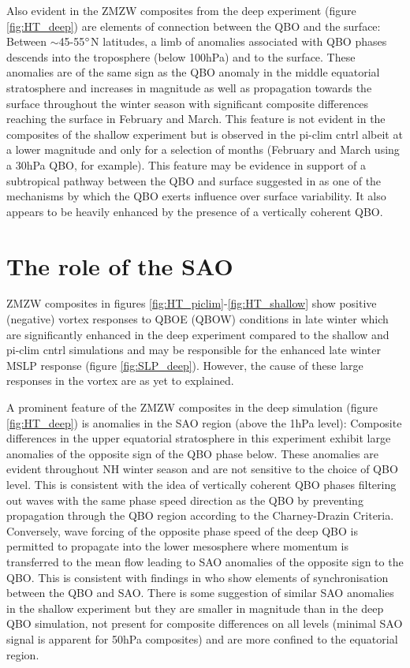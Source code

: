 Also evident in the ZMZW composites from the deep experiment (figure \ref{fig:HT_deep}) are elements of connection between the QBO and the surface: Between $\sim$45-55$\degree$N latitudes, a limb of anomalies associated with QBO phases descends into the troposphere (below 100hPa) and to the surface. These anomalies are of the same sign as the QBO anomaly in the middle equatorial stratosphere and increases in magnitude as well as propagation towards the surface throughout the winter season with significant composite differences reaching the surface in February and March. This feature is not evident in the composites of the shallow experiment but is observed in the pi-clim cntrl albeit at a lower magnitude and only for a selection of months (February and March using a 30hPa QBO, for example). This feature may be evidence in support of a subtropical pathway between the QBO and surface suggested in \cite{graySurface2018b} as one of the mechanisms by which the QBO exerts influence over surface variability. It also appears to be heavily enhanced by the presence of a vertically coherent QBO.

\section{The role of the SAO}
\label{sec:role_SAO}

ZMZW composites in figures \ref{fig:HT_piclim}-\ref{fig:HT_shallow} show positive (negative) vortex responses to QBOE (QBOW) conditions in late winter which are significantly enhanced in the deep experiment compared to the shallow and pi-clim cntrl simulations and may be responsible for the enhanced late winter MSLP response (figure \ref{fig:SLP_deep}). However, the cause of these large responses in the vortex are as yet to explained. 

A prominent feature of the ZMZW composites in the deep simulation (figure \ref{fig:HT_deep}) is anomalies in the SAO region (above the 1hPa level): Composite differences in the upper equatorial stratosphere in this experiment exhibit large anomalies of the opposite sign of the QBO phase below. These anomalies are evident throughout NH winter season and are not sensitive to the choice of QBO level. This is consistent with the idea of vertically coherent QBO phases filtering out waves with the same phase speed direction as the QBO by preventing propagation through the QBO region according to the Charney-Drazin Criteria. Conversely, wave forcing of the opposite phase speed of the deep QBO is permitted to propagate into the lower mesosphere where momentum is transferred to the mean flow leading to SAO anomalies of the opposite sign to the QBO. This is consistent with findings in \citep{kuaiNonstationary2009c} who show elements of synchronisation between the QBO and SAO. There is some suggestion of similar SAO anomalies in the shallow experiment but they are smaller in magnitude than in the deep QBO simulation, not present for composite differences on all levels (minimal SAO signal is apparent for 50hPa composites) and are more confined to the equatorial region.


